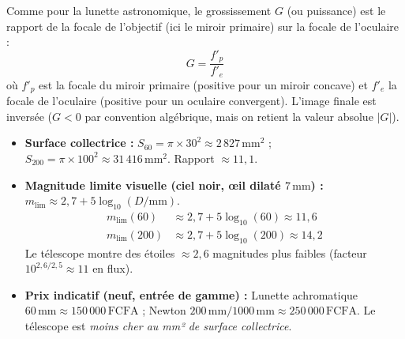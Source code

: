 \documentclass[11pt]{article}
\begin{document}
\begin{propriete}
Comme pour la lunette astronomique, le grossissement $G$ (ou puissance) est le rapport de la focale de l'objectif (ici le miroir primaire) sur la focale de l'oculaire :
\[
G = \frac{f'_p}{f'_e}
\]
où $f'_p$ est la focale du miroir primaire (positive pour un miroir concave) et $f'_e$ la focale de l'oculaire (positive pour un oculaire convergent). L'image finale est inversée ($G < 0$ par convention algébrique, mais on retient la valeur absolue $|G|$).
\end{propriete}

\begin{exemplebox}
\begin{itemize}
    \item \textbf{Surface collectrice :} $S_{60} = \pi \times 30^2 \approx 2\,827\,\text{mm}^2$ ; $S_{200} = \pi \times 100^2 \approx 31\,416\,\text{mm}^2$. Rapport $\approx 11,1$.
    \item \textbf{Magnitude limite visuelle (ciel noir, œil dilaté $7\,\text{mm}$) :} $m_{\text{lim}} \approx 2,7 + 5\log_{10}(D/\text{mm})$.
        \begin{align*}
            m_{\text{lim}}(60) &\approx 2,7 + 5\log_{10}(60) \approx 11,6 \\
            m_{\text{lim}}(200) &\approx 2,7 + 5\log_{10}(200) \approx 14,2
        \end{align*}
        Le télescope montre des étoiles $\approx 2,6$ magnitudes plus faibles (facteur $10^{2,6/2,5} \approx 11$ en flux).
    \item \textbf{Prix indicatif (neuf, entrée de gamme) :} Lunette achromatique $60\,\text{mm} \approx 150\,000\,\text{FCFA}$ ; Newton $200\,\text{mm}/1000\,\text{mm} \approx 250\,000\,\text{FCFA}$. Le télescope est \emph{moins cher au mm² de surface collectrice}.
\end{itemize}
\end{exemplebox}
\end{document}
